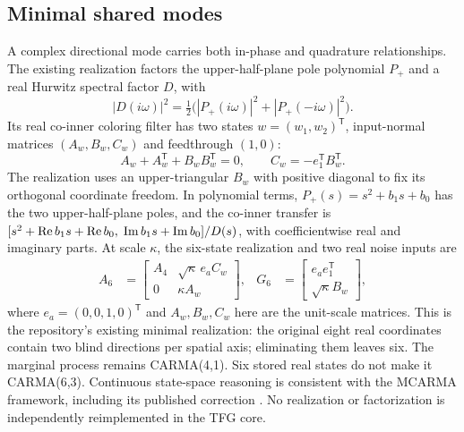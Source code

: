 \documentclass[conference]{IEEEtran}
\newcommand{\T}{^{\mathsf T}}\newcommand{\Hh}{^{\mathsf H}}
\begin{document}
\subsection{Minimal shared modes}
A complex directional mode carries both in-phase and quadrature relationships.
The existing realization factors the upper-half-plane pole polynomial $P_+$
and a real Hurwitz spectral factor $D$, with
\begin{equation}
 |D(i\omega)|^2=\tfrac12\bigl(|P_+(i\omega)|^2+|P_+(-i\omega)|^2\bigr).
\end{equation}
Its real co-inner coloring filter has two states $w=(w_1,w_2)\T$,
input-normal matrices $(A_w,B_w,C_w)$ and feedthrough $(1,0)$:
\begin{equation}
 A_w+A_w\T+B_wB_w\T=0,\qquad C_w=-e_1\T B_w\T .
\end{equation}
The realization uses an upper-triangular $B_w$ with positive diagonal to
fix its orthogonal coordinate freedom. In polynomial terms,
$P_+(s)=s^2+b_1s+b_0$ has the two upper-half-plane poles, and the co-inner
transfer is $[s^2+\operatorname{Re} b_1s+\operatorname{Re} b_0,\;\operatorname{Im} b_1s+\operatorname{Im} b_0]/D(s)$,
with coefficientwise real and imaginary parts. At scale $\kappa$,
the six-state realization and two real noise inputs are
\begin{align}
 A_6&=\begin{bmatrix}A_4&\sqrt\kappa\,e_a C_w\\0&\kappa A_w\end{bmatrix},&
 G_6&=\begin{bmatrix}e_a e_1\T\\\sqrt\kappa B_w\end{bmatrix},
 \label{eq:a6}
\end{align}
where $e_a=(0,0,1,0)\T$ and $A_w,B_w,C_w$ here are the unit-scale matrices.
This is the repository's existing minimal realization: the original eight
real coordinates contain two blind directions per spatial axis; eliminating
them leaves six. The marginal process remains CARMA(4,1). Six stored real
states do not make it CARMA(6,3). Continuous state-space reasoning is consistent
with the MCARMA framework, including its published correction \cite{schlemm,stelzer}.
No realization or factorization is independently reimplemented in the TFG core.
\end{document}
